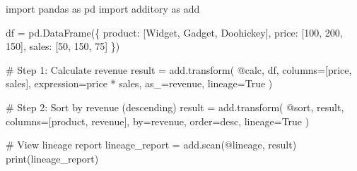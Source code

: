\documentclass[
  letterpaper,
]{scrbook}
\newenvironment{Shaded}{\begin{snugshade}}{\end{snugshade}}
\newcommand{\BuiltInTok}[1]{\textcolor[rgb]{0.00,0.23,0.31}{#1}}
\newcommand{\CommentTok}[1]{\textcolor[rgb]{0.37,0.37,0.37}{#1}}
\newcommand{\DecValTok}[1]{\textcolor[rgb]{0.68,0.00,0.00}{#1}}
\newcommand{\ImportTok}[1]{\textcolor[rgb]{0.00,0.46,0.62}{#1}}
\newcommand{\NormalTok}[1]{\textcolor[rgb]{0.00,0.23,0.31}{#1}}
\newcommand{\OperatorTok}[1]{\textcolor[rgb]{0.37,0.37,0.37}{#1}}
\newcommand{\StringTok}[1]{\textcolor[rgb]{0.13,0.47,0.30}{#1}}
\newcommand{\VariableTok}[1]{\textcolor[rgb]{0.07,0.07,0.07}{#1}}
\begin{document}
\begin{Shaded}
\begin{Highlighting}[]
\ImportTok{import}\NormalTok{ pandas }\ImportTok{as}\NormalTok{ pd}
\ImportTok{import}\NormalTok{ additory }\ImportTok{as}\NormalTok{ add}

\NormalTok{df }\OperatorTok{=}\NormalTok{ pd.DataFrame(\{}
    \StringTok{\textquotesingle{}product\textquotesingle{}}\NormalTok{: [}\StringTok{\textquotesingle{}Widget\textquotesingle{}}\NormalTok{, }\StringTok{\textquotesingle{}Gadget\textquotesingle{}}\NormalTok{, }\StringTok{\textquotesingle{}Doohickey\textquotesingle{}}\NormalTok{],}
    \StringTok{\textquotesingle{}price\textquotesingle{}}\NormalTok{: [}\DecValTok{100}\NormalTok{, }\DecValTok{200}\NormalTok{, }\DecValTok{150}\NormalTok{],}
    \StringTok{\textquotesingle{}sales\textquotesingle{}}\NormalTok{: [}\DecValTok{50}\NormalTok{, }\DecValTok{150}\NormalTok{, }\DecValTok{75}\NormalTok{]}
\NormalTok{\})}

\CommentTok{\# Step 1: Calculate revenue}
\NormalTok{result }\OperatorTok{=}\NormalTok{ add.transform(}
    \StringTok{\textquotesingle{}@calc\textquotesingle{}}\NormalTok{,}
\NormalTok{    df,}
\NormalTok{    columns}\OperatorTok{=}\NormalTok{[}\StringTok{\textquotesingle{}price\textquotesingle{}}\NormalTok{, }\StringTok{\textquotesingle{}sales\textquotesingle{}}\NormalTok{],}
\NormalTok{    expression}\OperatorTok{=}\StringTok{\textquotesingle{}price * sales\textquotesingle{}}\NormalTok{,}
\NormalTok{    as\_}\OperatorTok{=}\StringTok{\textquotesingle{}revenue\textquotesingle{}}\NormalTok{,}
\NormalTok{    lineage}\OperatorTok{=}\VariableTok{True}
\NormalTok{)}

\CommentTok{\# Step 2: Sort by revenue (descending)}
\NormalTok{result }\OperatorTok{=}\NormalTok{ add.transform(}
    \StringTok{\textquotesingle{}@sort\textquotesingle{}}\NormalTok{,}
\NormalTok{    result,}
\NormalTok{    columns}\OperatorTok{=}\NormalTok{[}\StringTok{\textquotesingle{}product\textquotesingle{}}\NormalTok{, }\StringTok{\textquotesingle{}revenue\textquotesingle{}}\NormalTok{],}
\NormalTok{    by}\OperatorTok{=}\StringTok{\textquotesingle{}revenue\textquotesingle{}}\NormalTok{,}
\NormalTok{    order}\OperatorTok{=}\StringTok{\textquotesingle{}desc\textquotesingle{}}\NormalTok{,}
\NormalTok{    lineage}\OperatorTok{=}\VariableTok{True}
\NormalTok{)}

\CommentTok{\# View lineage report}
\NormalTok{lineage\_report }\OperatorTok{=}\NormalTok{ add.scan(}\StringTok{\textquotesingle{}@lineage\textquotesingle{}}\NormalTok{, result)}
\BuiltInTok{print}\NormalTok{(lineage\_report)}
\end{Highlighting}
\end{Shaded}
\end{document}
